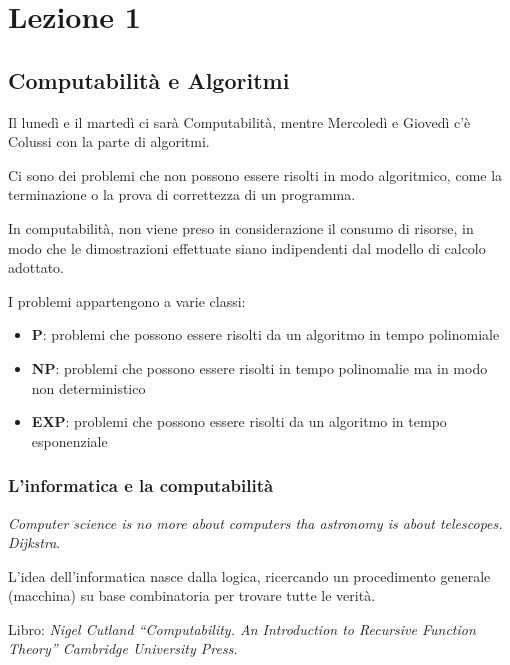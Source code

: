 \chapter{Lezione 1}
\section{Computabilità e
Algoritmi}\label{lezione-1---computabilituxe0-e-algoritmi}

Il lunedì e il martedì ci sarà Computabilità, mentre Mercoledì e Giovedì
c'è Colussi con la parte di algoritmi.

Ci sono dei problemi che non possono essere risolti in modo algoritmico,
come la terminazione o la prova di correttezza di un programma.

In computabilità, non viene preso in considerazione il consumo di
risorse, in modo che le dimostrazioni effettuate siano indipendenti dal
modello di calcolo adottato.

I problemi appartengono a varie classi:

\begin{itemize}
\tightlist
\item
  \textbf{P}: problemi che possono essere risolti da un algoritmo in
  tempo polinomiale
\item
  \textbf{NP}: problemi che possono essere risolti in tempo polinomalie
  ma in modo non deterministico
\item
  \textbf{EXP}: problemi che possono essere risolti da un algoritmo in
  tempo esponenziale
\end{itemize}

\subsection{L'informatica e la
computabilità}\label{linformatica-e-la-computabilituxe0}

\emph{Computer science is no more about computers tha astronomy is about
telescopes. Dijkstra}.

L'idea dell'informatica nasce dalla logica, ricercando un procedimento
generale (macchina) su base combinatoria per trovare tutte le verità.

Libro: \emph{Nigel Cutland ``Computability. An Introduction to Recursive
Function Theory'' Cambridge University Press}.

